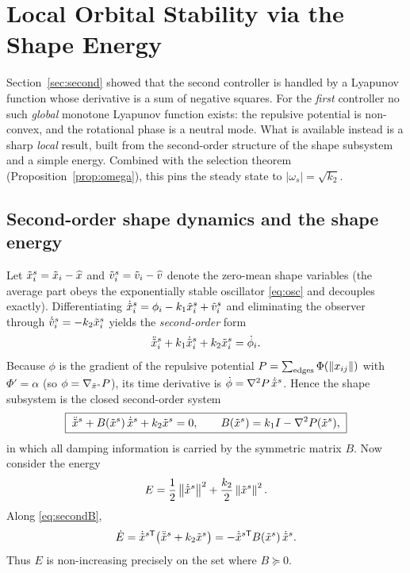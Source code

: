 \section{Local Orbital Stability via the Shape Energy}
\label{sec:corotating}

Section~\ref{sec:second} showed that the second controller is handled by a Lyapunov function whose
derivative is a sum of negative squares. For the \emph{first} controller no such \emph{global}
monotone Lyapunov function exists: the repulsive potential is non-convex, and the rotational phase
is a neutral mode. What is available instead is a sharp \emph{local} result, built from the
second-order structure of the shape subsystem and a simple energy. Combined with the selection
theorem (Proposition~\ref{prop:omega}), this pins the steady state to $|\omega_s|=\sqrt{k_2}$.

\subsection{Second-order shape dynamics and the shape energy}
\label{sec:second_order}

Let $\tilde{x}_i^s=\tilde{x}_i-\widehat{x}$ and $\tilde{v}_i^s=\tilde{v}_i-\widehat{v}$ denote the zero-mean shape variables (the
average part obeys the exponentially stable oscillator \eqref{eq:osc} and decouples exactly).
Differentiating $\dot{\tilde{x}}_i^s=\phi_i-k_1\tilde{x}_i^s+\tilde{v}_i^s$ and eliminating the observer through
$\dot{\tilde{v}}_i^s=-k_2\tilde{x}_i^s$ yields the \emph{second-order} form
\begin{equation}
  \ddot{\tilde{x}}_i^s+k_1\dot{\tilde{x}}_i^s+k_2\tilde{x}_i^s=\dot{\phi}_i .
  \label{eq:second}
\end{equation}
Because $\phi$ is the gradient of the repulsive potential
$P=\sum_{\text{edges}}\Phi(\left\| x_{ij} \right\|)$ with $\Phi'=\alpha$ (so $\phi=\nabla_{\tilde{x}^s}P$), its time
derivative is $\dot{\phi}=\nabla^2 P\,\dot{\tilde{x}}^s$. Hence the shape subsystem is the closed
second-order system
\begin{equation}
  \boxed{\;\ddot{\tilde{x}}^s+B(\tilde{x}^s)\,\dot{\tilde{x}}^s+k_2\tilde{x}^s=0,\qquad
  B(\tilde{x}^s)=k_1I-\nabla^2 P(\tilde{x}^s),\;}
  \label{eq:secondB}
\end{equation}
in which all damping information is carried by the symmetric matrix $B$. Now consider the energy
\begin{equation}
  E=\frac12\left\| \dot{\tilde{x}}^s \right\|^2+\frac{k_2}{2}\left\| \tilde{x}^s \right\|^2 .
  \label{eq:energy}
\end{equation}
Along \eqref{eq:secondB},
\begin{equation}
  \dot E=\dot{\tilde{x}}^{s\mathsf T}\bigl(\ddot{\tilde{x}}^s+k_2\tilde{x}^s\bigr)
       =-\dot{\tilde{x}}^{s\mathsf T}B(\tilde{x}^s)\,\dot{\tilde{x}}^s .
  \label{eq:Edot}
\end{equation}
Thus $E$ is non-increasing precisely on the set where $B\succeq0$.

